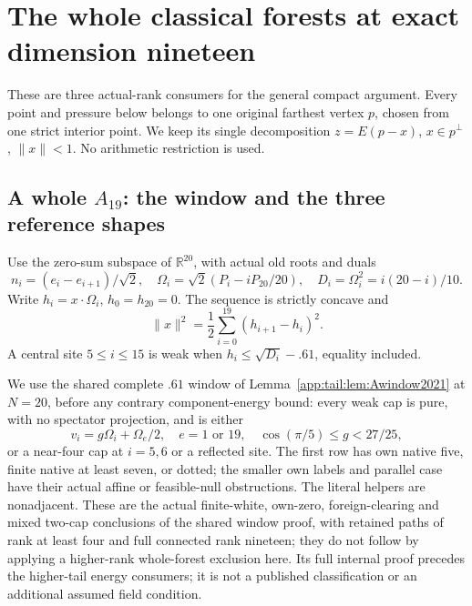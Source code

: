 \section{The whole classical forests at exact dimension nineteen}
\label{app:exact19:wholeclassical}

These are three actual-rank consumers for
the general compact argument.
Every point and pressure below belongs
to one original farthest vertex \(p\),
chosen from one strict interior point.
We keep its single decomposition
\(z=E(p-x)\), \(x\in p^\perp\),
\(\|x\|<1\).
No arithmetic restriction is used.

\subsection{A whole \(A_{19}\): the window and the three reference shapes}
\label{app:exact19:Awindow}

Use the zero-sum subspace of
\(\mathbb R^{20}\), with actual old roots
and duals
\[
 n_i=(e_i-e_{i+1})/\sqrt2,\quad
 \Omega_i=\sqrt2(P_i-iP_{20}/20),\quad
 D_i=\Omega_i^2=i(20-i)/10 .
\]
Write \(h_i=x\cdot\Omega_i\), \(h_0=h_{20}=0\).
The sequence is strictly concave and
\[
                 \|x\|^2=\frac12\sum_{i=0}^{19}(h_{i+1}-h_i)^2 .
\]
A central site \(5\le i\le15\) is weak
when \(h_i\le\sqrt{D_i}-.61\), equality
included.

We use the shared complete \(.61\) window
of Lemma~\ref{app:tail:lem:Awindow2021}
at \(N=20\), before any contrary
component-energy bound: every weak cap
is pure, with no spectator projection,
and is either
\[
 v_i=g\Omega_i+\Omega_e/2,\quad e=1\text{ or }19,
 \quad \cos(\pi/5)\le g<27/25 ,
\]
or a near-four cap at \(i=5,6\) or
a reflected site.
The first row has own native five,
finite native at least seven, or dotted;
the smaller own labels and parallel case
have their actual affine or feasible-null
obstructions.
The literal helpers are nonadjacent.
These are the actual finite-white,
own-zero, foreign-clearing and mixed
two-cap conclusions of the shared
window proof, with retained paths of
rank at least four and full connected
rank nineteen; they do not follow by
applying a higher-rank whole-forest
exclusion here.
Its full internal proof precedes
the higher-tail energy consumers;
it is not a published classification
or an additional assumed field condition.

